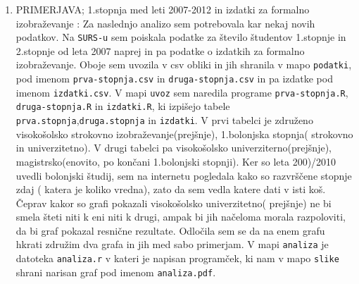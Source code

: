 \documentclass[11pt,a4paper]{article}
\begin{document}
\begin{enumerate}
\begin{enumerate}
\end{enumerate}



\pagebreak

\item{PRIMERJAVA; 1.stopnja med leti 2007-2012 in izdatki za formalno izobraževanje} : Za naslednjo analizo sem potrebovala kar nekaj novih podatkov. Na \verb|SURS-u| sem poiskala podatke za število študentov 1.stopnje in 2.stopnje od leta 2007 naprej in pa podatke o izdatkih za formalno izobraževanje. Oboje sem uvozila v csv obliki in jih shranila v mapo \verb|podatki|, pod imenom \verb|prva-stopnja.csv| in \verb|druga-stopnja.csv| in pa izdatke pod imenom \verb|izdatki.csv|. V mapi \verb|uvoz| sem naredila programe \verb|prva-stopnja.R|, \verb|druga-stopnja.R| in \verb|izdatki.R|, ki izpišejo tabele \verb|prva.stopnja|,\verb|druga.stopnja| in \verb|izdatki|. V prvi tabelci je združeno visokošolsko strokovno izobraževanje(prejšnje), 1.bolonjska stopnja( strokovno in univerzitetno). V drugi tabelci pa visokošolsko univerziterno(prejšnje), magistrsko(enovito, po končani 1.bolonjski stopnji). Ker so leta 200)/2010 uvedli bolonjski študij, sem na internetu pogledala kako so razvrščene stopnje zdaj ( katera je koliko vredna), zato da sem vedla katere dati v isti koš. Čeprav kakor so grafi pokazali visokošolsko univerzitetno( prejšnje) ne bi smela šteti niti k eni niti k drugi, ampak bi jih načeloma morala razpoloviti, da bi graf pokazal resnične rezultate. Odločila sem se da na enem grafu hkrati združim dva grafa in jih med sabo primerjam. V mapi \verb|analiza| je datoteka \verb|analiza.r| v kateri je napisan programček, ki nam v mapo \verb|slike| shrani narisan graf pod imenom \verb|analiza.pdf|. 





\end{enumerate}
\end{document}
